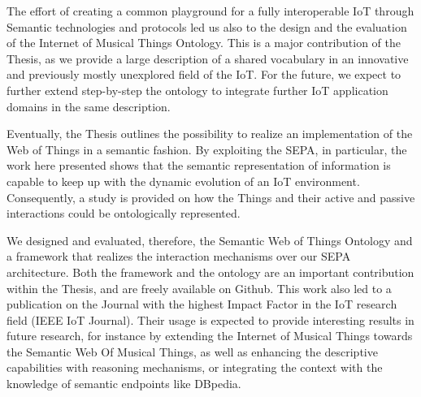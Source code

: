 \documentclass[11pt, twoside, openright]{report}   	%
\begin{document}
The effort of creating a common playground for a fully interoperable IoT through Semantic technologies and protocols led us also to the design and the evaluation of the Internet of Musical Things Ontology. This is a major contribution of the Thesis, as we provide a large description of a shared vocabulary in an innovative and previously mostly unexplored field of the IoT. For the future, we expect to further extend step-by-step the ontology to integrate further IoT application domains in the same description.

Eventually, the Thesis outlines the possibility to realize an implementation of the Web of Things in a semantic fashion. By exploiting the SEPA, in particular, the work here presented shows that the semantic representation of information is capable to keep up with the dynamic evolution of an IoT environment. Consequently, a study is provided on how the Things and their active and passive interactions could be ontologically represented. 

We designed and evaluated, therefore, the Semantic Web of Things Ontology and a framework that realizes the interaction mechanisms over our SEPA architecture. Both the framework and the ontology are an important contribution within the Thesis, and are freely available on Github. This work also led to a publication on the Journal with the highest Impact Factor in the IoT research field (IEEE IoT Journal). Their usage is expected to provide interesting results in future research, for instance by extending the Internet of Musical Things towards the Semantic Web Of Musical Things, as well as enhancing the descriptive capabilities with reasoning mechanisms, or integrating the context with the knowledge of semantic endpoints like DBpedia.
\end{document}
